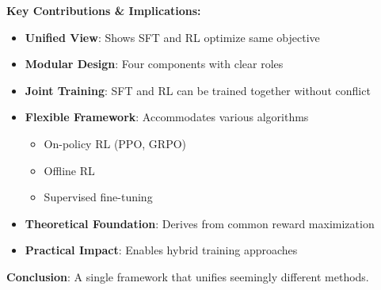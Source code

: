 \begin{frame}
\textbf{Key Contributions \& Implications:}

\vspace{0.2cm}

\begin{itemize}
    \item \textbf{Unified View}: Shows SFT and RL optimize same objective
    \item \textbf{Modular Design}: Four components with clear roles
    \item \textbf{Joint Training}: SFT and RL can be trained together without conflict
    \item \textbf{Flexible Framework}: Accommodates various algorithms
    \begin{itemize}
        \item On-policy RL (PPO, GRPO)
        \item Offline RL
        \item Supervised fine-tuning
    \end{itemize}
    \item \textbf{Theoretical Foundation}: Derives from common reward maximization
    \item \textbf{Practical Impact}: Enables hybrid training approaches
\end{itemize}

\vspace{0.2cm}

\textbf{Conclusion}: A single framework that unifies seemingly different methods.
\end{frame}